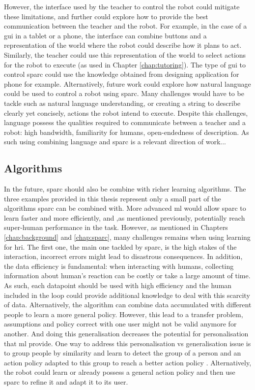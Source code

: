 However, the interface used by the teacher to control the robot could mitigate these limitations, and further could explore how to provide the best communication between the teacher and the robot. For example, in the case of a \gls{gui} in a tablet or a phone, the interface can combine buttons and a representation of the world where the robot could describe how it plans to act. Similarly, the teacher could use this representation of the world to select actions for the robot to execute (as used in Chapter \ref{chap:tutoring}). The type of \gls{gui} to control \gls{sparc} could use the knowledge obtained from designing application for phone for example. Alternatively, future work could explore how natural language could be used to control a robot using \gls{sparc}. Many challenges would have to be tackle such as natural language understanding, or creating a string to describe clearly yet concisely, actions the robot intend to execute. Despite this challenges, language possess the qualities required to communicate between a teacher and a robot: high bandwidth, familiarity for humans, open-endedness of description. As such using combining language and \gls{sparc} is a relevant direction of work...

\subsection{Algorithms}

In the future, \gls{sparc} should also be combine with richer learning algorithms. The three examples provided in this thesis represent only a small part of the algorithms \gls{sparc} can be combined with. More advanced \gls{ml} would allow \gls{sparc} to learn faster and more efficiently, and ,as mentioned previously, potentially reach super-human performance in the task. However, as mentioned in Chapters \ref{chap:background} and \ref{chap:sparc}, many challenges remains when using learning for \gls{hri}. The first one, the main one tackled by \gls{sparc}, is the high stakes of the interaction, incorrect errors might lead to disastrous consequences. In addition, the data efficiency is fundamental: when interacting with humans, collecting information about human's reaction can be costly or take a large amount of time. As such, each datapoint should be used with high efficiency and the human included in the loop could provide additional knowledge to deal with this scarcity of data. Alternatively, the algorithm can combine data accumulated with different people to learn a more general policy. However, this lead to a transfer problem, assumptions and policy correct with one user might not be valid anymore for another. And doing this generalisation decreases the potential for personalisation that \gls{ml} provide. One way to address this personalisation vs generalisation issue is to group people by similarity and learn to detect the group of a person and an action policy adapted to this group to reach a better action policy \citep{brunskill2014pac}. Alternatively, the robot could learn or already possess a general action policy and then use \gls{sparc} to refine it and adapt it to its user. 

